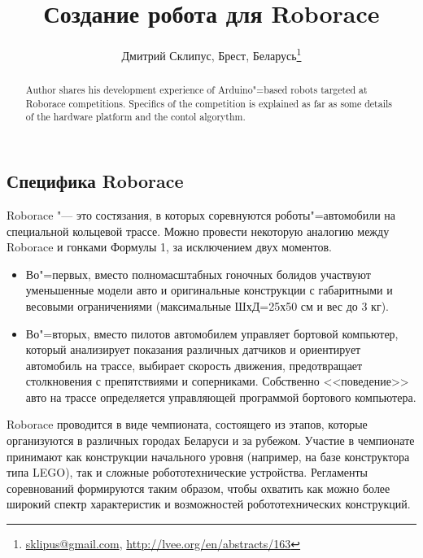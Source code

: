 \documentclass[10pt, a5paper]{article}
\begin{document}
\title{Создание робота для Roborace}
\author{Дмитрий Склипус, Брест, Беларусь\footnote{\url{sklipus@gmail.com}, \url{http://lvee.org/en/abstracts/163}}}
\maketitle
\begin{abstract}
Author shares his development experience of Arduino"=based robots targeted at Roborace competitions. Specifics of the com\-petition is explained as far as some details of the hardware platform and the contol algorythm.
\end{abstract}
\subsection*{Специфика Roborace}

Roborace "--- это состязания, в которых соревнуются роботы"=автомобили на специальной кольцевой трассе. Можно провести некоторую аналогию между Roborace и гонками Формулы 1, за исключением двух моментов.

\begin{itemize}
  \item Во"=первых, вместо полномасштабных гоночных болидов участвуют уменьшенные модели авто и оригинальные конструкции с габаритными и весовыми ограничениями (максимальные ШхД=25х50 см и вес до 3 кг).
  \item Во"=вторых, вместо пилотов автомобилем управляет бортовой компьютер, который анализирует показания различных датчиков и ориентирует автомобиль на трассе, выбирает скорость движения, предотвращает столкновения с препятствиями и соперниками. Собственно <<поведение>> авто на трассе определяется управляющей программой бортового компьютера.
\end{itemize}

Roborace проводится в виде чемпионата, состоящего из этапов, которые организуются в различных городах Беларуси и за рубежом. Участие в чемпионате принимают как конструкции начального уровня (например, на базе конструктора типа LEGO), так и сложные робототехнические устройства. Регламенты соревнований формируются таким образом, чтобы охватить как можно более широкий спектр характеристик и возможностей робототехнических конструкций.
\end{document}
